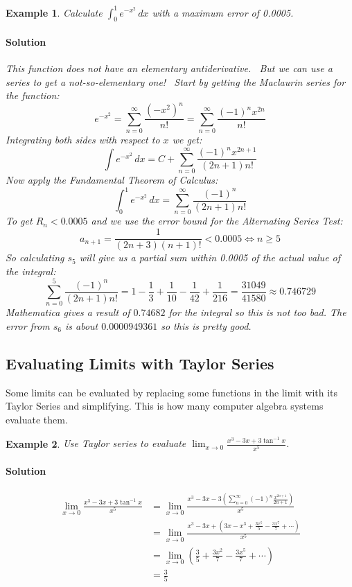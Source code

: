 \documentclass[letterpaper, 11pt, openany]{book}
\theoremstyle{mytheoremstyle}
\theoremstyle{myexamplestyle}
\newtheorem{example}{Example}[section]
\newenvironment{solution}{\paragraph{\sffamily \smaller \fontseries{b}\selectfont Solution}}{\hfill\faSquare}
\begin{document}
\begin{example}\label{e:Macserieserf}
    Calculate $\displaystyle \int_{0}^{1} e^{-x^{2}} \, dx$ with a maximum error of 0.0005.
    \begin{solution}
        This function does not have an elementary antiderivative. \faFrown \ But we can use a series to get a not-so-elementary one! \faSmile \ Start by getting the Maclaurin series for the function:
        \[e^{-x^{2}} = \sum_{n=0}^{\infty} \frac{(-x^{2})^{n}}{n!} = \sum_{n=0}^{\infty} \frac{(-1)^{n} x^{2n}}{n!}\]
        Integrating both sides with respect to $x$ we get:
        \[\int e^{-x^{2}} \, dx = C + \sum_{n=0}^{\infty} \frac{(-1)^{n} x^{2n+1}}{(2n+1)n!}\]
        Now apply the Fundamental Theorem of Calculus:
        \[\int_{0}^{1} e^{-x^{2}} \, dx = \sum_{n=0}^{\infty} \frac{(-1)^{n}}{(2n+1)n!}\]
        To get $R_{n} < 0.0005$ and we use the error bound for the Alternating Series Test:
        \[a_{n+1} = \frac{1}{(2n+3)(n+1)!} < 0.0005 \Leftrightarrow n \geq 5\]
        So calculating $s_{5}$ will give us a partial sum within 0.0005 of the actual value of the integral:
        \[\sum_{n=0}^{5} \frac{(-1)^{n}}{(2n+1)n!} = 1 - \frac{1}{3} + \frac{1}{10} - \frac{1}{42} + \frac{1}{216} = \frac{31049}{41580} \approx 0.746729\]
        Mathematica gives a result of $0.74682$ for the integral so this is not too bad. The error from $s_{6}$ is about $0.0000949361$ so this is pretty good.
    \end{solution}
\end{example}

\subsection{Evaluating Limits with Taylor Series}

Some limits can be evaluated by replacing some functions in the limit with its Taylor Series and simplifying. This is how many computer algebra systems evaluate them.

\begin{example}
    Use Taylor series to evaluate \(\displaystyle \lim_{x \to 0} \frac{x^3 - 3x + 3\tan^{-1}x }{x^5}\).
    \begin{solution}
        \begin{align*}
            \lim_{x \to 0} \frac{x^3 - 3x + 3\tan^{-1}x }{x^5} &= \lim_{x \to 0} \frac{x^3 - 3x - 3\left(\sum_{n=0}^{\infty} (-1)^n \frac{x^{2n+1}}{2n+1}\right)}{x^5}\\
            &= \lim_{x \to 0} \frac{x^3 - 3x + \left(3x - x^3 + \frac{3x^5}{5} - \frac{3x^7}{7} + \cdots\right)}{x^5}\\
            &= \lim_{x \to 0} \left(\frac{3}{5} + \frac{3x^2}{7} - \frac{3x^5}{7} + \cdots\right)\\
            &= \frac{3}{5}
        \end{align*}
    \end{solution}
\end{example}
\end{document}
